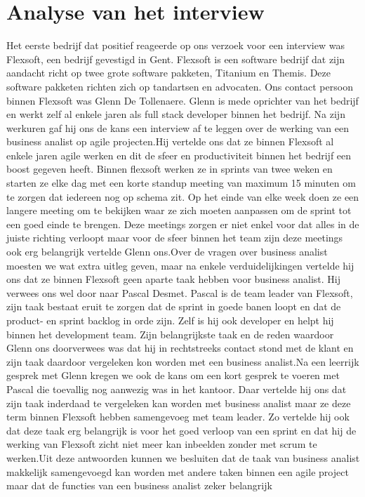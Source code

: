 \documentclass{hogent-article}
\begin{document}
\section{Analyse van het interview}
Het eerste bedrijf dat positief reageerde op ons verzoek voor een interview was Flexsoft, een bedrijf gevestigd in Gent. Flexsoft is een software bedrijf dat zijn aandacht richt op twee grote software pakketen, Titanium en Themis. Deze software pakketen richten zich op tandartsen en advocaten. \newline \newline Ons contact persoon binnen Flexsoft was Glenn De Tollenaere. Glenn is mede oprichter van het bedrijf en werkt zelf al enkele jaren als full stack developer binnen het bedrijf. Na zijn werkuren gaf hij ons de kans een interview af te leggen over de werking van een business analist op agile projecten.\newline \newline Hij vertelde ons dat ze binnen Flexsoft al enkele jaren agile werken en dit de sfeer en productiviteit binnen het bedrijf een boost gegeven heeft. Binnen flexsoft werken ze in sprints van twee weken en starten ze elke dag met een korte standup meeting van maximum 15 minuten om te zorgen dat iedereen nog op schema zit. Op het einde van elke week doen ze een langere meeting om te bekijken waar ze zich moeten aanpassen om de sprint tot een goed einde te brengen. Deze meetings zorgen er niet enkel voor dat alles in de juiste richting verloopt maar voor de sfeer binnen het team zijn deze meetings ook erg belangrijk vertelde Glenn ons.\newline \newline Over de vragen over business analist moesten we wat extra uitleg geven, maar na enkele verduidelijkingen vertelde hij ons dat ze binnen Flexsoft geen aparte taak hebben voor business analist. Hij verwees ons wel door naar Pascal Desmet. Pascal is de team leader van Flexsoft, zijn taak bestaat eruit te zorgen dat de sprint in goede banen loopt en dat de product- en sprint backlog in orde zijn. Zelf is hij ook developer en helpt hij binnen het development team. Zijn belangrijkste taak en de reden waardoor Glenn ons doorverwees was dat hij in rechtstreeks contact stond met de klant en zijn taak daardoor vergeleken kon worden met een business analist.\newline \newline Na een leerrijk gesprek met Glenn kregen we ook de kans om een kort gesprek te voeren met Pascal die toevallig nog aanwezig was in het kantoor. Daar vertelde hij ons dat zijn taak inderdaad te vergeleken kan worden met business analist maar ze deze term binnen Flexsoft hebben samengevoeg met team leader. Zo vertelde hij ook dat deze taak erg belangrijk is voor het goed verloop van een sprint en dat hij de werking van Flexsoft zicht niet meer kan inbeelden zonder met scrum te werken.\newline \newline Uit deze antwoorden kunnen we besluiten dat de taak van business analist makkelijk samengevoegd kan worden met andere taken binnen een agile project maar dat de functies van een business analist zeker belangrijk 
\end{document}
